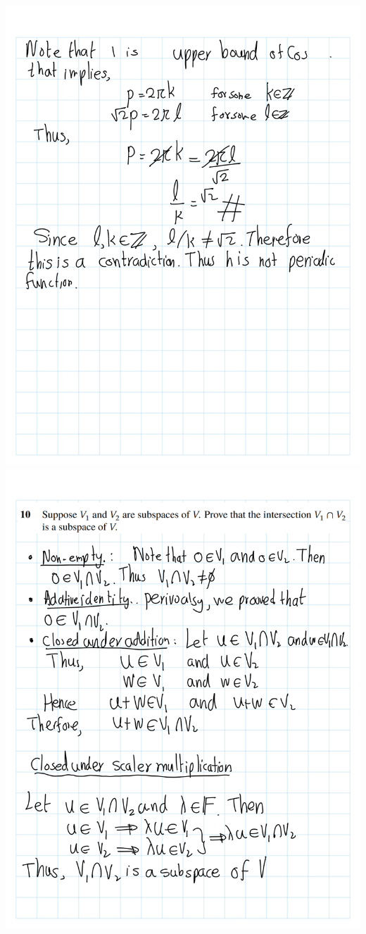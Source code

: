\documentclass[
]{book}
\theoremstyle{definition}
\theoremstyle{definition}
\theoremstyle{definition}
\theoremstyle{definition}
\theoremstyle{remark}
\begin{document}
\begin{enumerate}
  \includegraphics{fig/Ex1C/Ex/Ex-08.png} \includegraphics{fig/Ex1C/Ex/Ex-09.png}

\end{enumerate}
\end{document}
